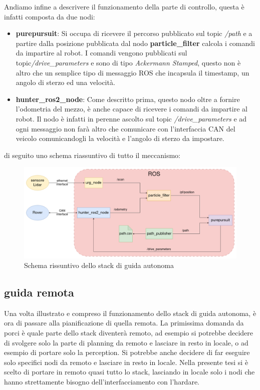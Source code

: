 \noindent Andiamo infine a descrivere il funzionamento della parte di controllo, questa è infatti composta da due nodi:

\begin{itemize}
  \item \textbf{purepursuit}: Si occupa di ricevere il percorso pubblicato sul topic \textit{/path} e a partire dalla posizione pubblicata dal nodo \textbf{particle\_filter} calcola i comandi da impartire al robot. I comandi vengono pubblicati sul topic\textit{/drive\_parameters} e sono di tipo \textit{Ackermann Stamped}, questo non è altro che un semplice tipo di messaggio ROS che incapsula il timestamp, un angolo di sterzo ed una velocità.
  \item \textbf{hunter\_ros2\_node}: Come descritto prima, questo nodo oltre a fornire l'odometria del mezzo, è anche capace di ricevere i comandi da impartire al robot. Il nodo è infatti in perenne ascolto sul topic \textit{/drive\_parameters} e ad ogni messaggio non farà altro che comunicare con l'interfaccia CAN del veicolo comunicandogli la velocità e l'angolo di sterzo da impostare.
\end{itemize}

\noindent di seguito uno schema riassuntivo di tutto il meccanismo:
\begin{figure}[h]
  \centering
  \includegraphics[width=1\textwidth]{figures/schema_guida_autonoma.png}
  \caption{Schema rissuntivo dello stack di guida autonoma}
  \label{Schema rissuntivo dello stack di guida autonoma}
\end{figure}

\subsection{guida remota}
Una volta illustrato e compreso il funzionamento dello stack di guida autonoma, è ora di passare alla pianificazione di quella remota.
La primissima domanda da porci è quale parte dello stack diventerà remoto, ad esempio si potrebbe decidere di svolgere solo la parte di planning da remoto e lasciare in resto in locale, o ad esempio di portare solo la perception. Si potrebbe anche decidere di far eseguire solo specifici nodi da remoto e lasciare in resto in locale.
\noindent Nella presente tesi si è scelto di portare in remoto quasi tutto lo stack, lasciando in locale solo i nodi che hanno strettamente bisogno dell'interfacciamento con l'hardare.

